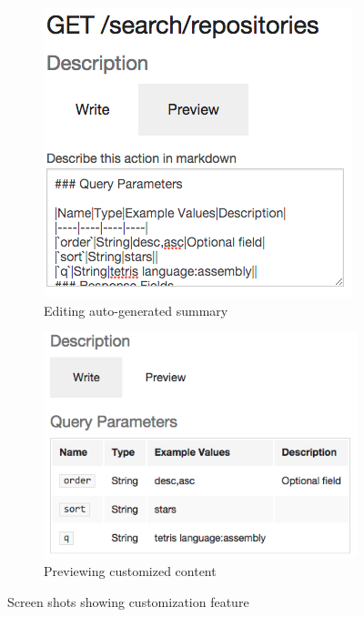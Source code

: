\documentclass[conference]{IEEEtran}
\begin{document}
\begin{figure}[!tbh]
  \centering
  \begin{subfigure}[t]{0.5\linewidth}
    \includegraphics[width=\linewidth]{edit.png}
    \caption{Editing auto-generated summary}
  \end{subfigure}
  \begin{subfigure}[t]{0.45\linewidth}
    \includegraphics[width=\linewidth]{preview.png}
    \caption{Previewing customized content}
  \end{subfigure}
  \caption{Screen shots showing customization feature}
  \label{fig:markdown}
\end{figure}
\end{document}
